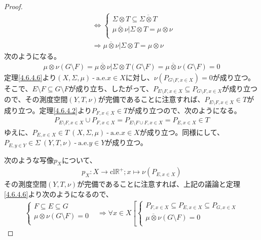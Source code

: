 \documentclass[dvipdfmx]{jsarticle}
\begin{document}
\begin{proof}
\begin{align*}
&\Leftrightarrow \left\{ \begin{matrix}
\varSigma \otimes T \subseteq \overline{\varSigma \otimes T} \\
\overline{\mu \otimes \nu}|\varSigma \otimes T = \mu \otimes \nu \\
\end{matrix} \right.\ \\
&\Rightarrow \overline{\mu \otimes \nu}|\varSigma \otimes T = \mu \otimes \nu
\end{align*}
次のようになる。
\begin{align*}
\mu \otimes \nu(G \setminus F) = \overline{\mu \otimes \nu}|\varSigma \otimes T(G \setminus F) = \overline{\mu \otimes \nu}(G \setminus F) = 0
\end{align*}
定理\ref{4.6.4.6}より$(X,\varSigma,\mu) \ \text{-} \ \mathrm{a.e.}x \in X$に対し、$\nu\left( P_{G \setminus F,x \in X} \right) = 0$が成り立つ。そこで、$E \setminus F \subseteq G \setminus F$が成り立ち、したがって、$P_{E \setminus F,x \in X} \subseteq P_{G \setminus F,x \in X}$が成り立つので、その測度空間$(Y,T,\nu)$が完備であることに注意すれば、$P_{E \setminus F,x \in X} \in T$が成り立つ。定理\ref{4.6.4.2}より$P_{F,x \in X} \in T$が成り立つので、次のようになる。
\begin{align*}
P_{E \setminus F,x \in X} \cup P_{F,x \in X} = P_{E \setminus F \cup F,x \in X} = P_{E,x \in X} \in T
\end{align*}
ゆえに、$P_{E,x \in X} \in T\ (X,\varSigma,\mu) \ \text{-} \ \mathrm{a.e.}x \in X$が成り立つ。同様にして、$P_{E,y \in Y} \in \varSigma\ (Y,T,\nu) \ \text{-} \ \mathrm{a.e.}y \in Y$が成り立つ。\par
次のような写像$p_{X}$について、
\begin{align*}
p_{X}:X \rightarrow \mathrm{cl}\mathbb{R}^{+};x \mapsto \nu\left( P_{E,x \in X} \right)
\end{align*}
その測度空間$(Y,T,\nu)$が完備であることに注意すれば、上記の議論と定理\ref{4.6.4.6}より次のようになるので、
\begin{align*}
\left\{ \begin{matrix}
F \subseteq E \subseteq G \\
\mu \otimes \nu(G \setminus F) = 0 \\
\end{matrix} \right. &\Rightarrow \forall x \in X\left[ \left\{ \begin{matrix}
P_{F,x \in X} \subseteq P_{E,x \in X} \subseteq P_{G,x \in X} \\
\overline{\mu \otimes \nu}(G \setminus F) = 0 \\

\end{matrix}
\end{align*}
\end{proof}
\end{document}
